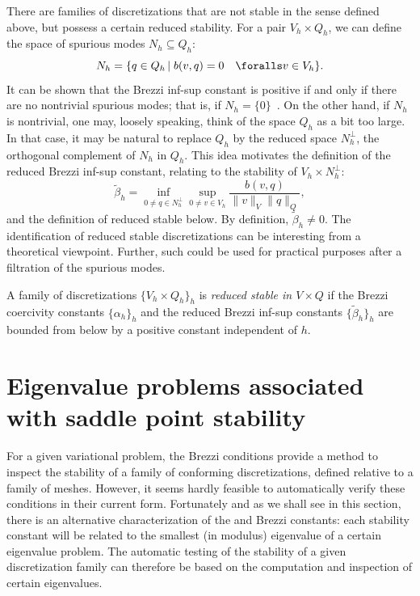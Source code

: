 There are families of discretizations that are not stable in the sense
defined above, but possess a certain reduced stability. For a pair
$V_h \times Q_h$, we can define the space of spurious modes $N_h
\subseteq Q_h$:
\begin{equation}
  N_h
  = \{q \in Q_h \, | \; b(v, q) = 0 \quad
  \foralls v \in V_h\}.
\end{equation}
It can be shown that the Brezzi inf-sup constant is positive if and
only if there are no nontrivial spurious modes; that is, if $N_h = \{
0 \}$~\citep{Qin1994}. On the other hand, if $N_h$ is nontrivial, one
may, loosely speaking, think of the space $Q_h$ as a bit too large.
In that case, it may be natural to replace $Q_h$ by the reduced space
$N_h^{\perp}$, the orthogonal complement of $N_h$ in $Q_h$. This idea
motivates the definition of the reduced Brezzi inf-sup constant,
relating to the stability of $V_h \times N_h^{\perp}$:
\begin{equation}
  \label{rognes:eq:reduced:infsup}
  \tilde \beta_h =
  \inf_{0 \not = q \in N_h^{\perp}}
  \sup_{0 \not = v \in V_h}
  \frac{b(v, q)}
       {\|v\|_{V} \|q\|_{Q}},
\end{equation}
and the definition of reduced stable below. By definition, $\tilde
\beta_h \not = 0$. The identification of reduced stable
discretizations can be interesting from a theoretical
viewpoint. Further, such could be used for practical purposes after a
filtration of the spurious modes.
\begin{definition}
  \label{rognes:def:reduced_stable}
  A family of discretizations $\{V_h \times Q_h\}_h$ is \emph{reduced
  stable in $V \times Q$} if the Brezzi coercivity constants
  $\{\alpha_h\}_h$ and the reduced Brezzi inf-sup constants
  $\{ \tilde \beta_h \}_h$ are bounded from below by a positive
  constant independent of $h$.
\end{definition}

\section{Eigenvalue problems associated with saddle point stability}

For a given variational problem, the Brezzi conditions provide a
method to inspect the stability of a family of conforming
discretizations, defined relative to a family of meshes. However, it
seems hardly feasible to automatically verify these conditions in
their current form. Fortunately and as we shall see in this section,
there is an alternative characterization of the \babuska{} and Brezzi
constants: each stability constant will be related to the smallest (in
modulus) eigenvalue of a certain eigenvalue problem. The automatic
testing of the stability of a given discretization family can
therefore be based on the computation and inspection of certain
eigenvalues.

